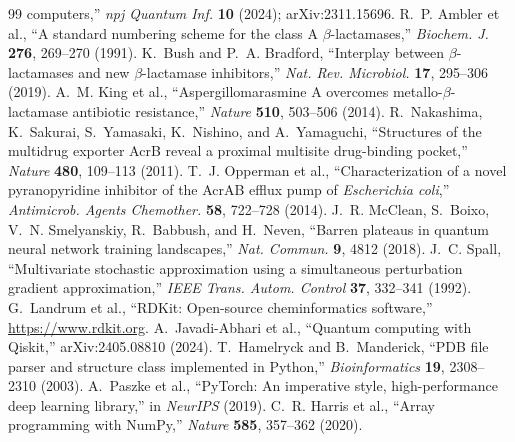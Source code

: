 \documentclass[10pt,twocolumn]{article}
\begin{document}
\begin{thebibliography}{99}
computers,'' \emph{npj Quantum Inf.} \textbf{10} (2024); arXiv:2311.15696.
 R.~P. Ambler et al., ``A standard numbering scheme for the class
A $\beta$-lactamases,'' \emph{Biochem. J.} \textbf{276}, 269--270 (1991).
 K.~Bush and P.~A. Bradford, ``Interplay between $\beta$-lactamases
and new $\beta$-lactamase inhibitors,'' \emph{Nat. Rev. Microbiol.} \textbf{17},
295--306 (2019).
 A.~M. King et al., ``Aspergillomarasmine A overcomes
metallo-$\beta$-lactamase antibiotic resistance,'' \emph{Nature} \textbf{510},
503--506 (2014).
 R.~Nakashima, K.~Sakurai, S.~Yamasaki, K.~Nishino, and
A.~Yamaguchi, ``Structures of the multidrug exporter AcrB reveal a proximal multisite
drug-binding pocket,'' \emph{Nature} \textbf{480}, 109--113 (2011).
 T.~J. Opperman et al., ``Characterization of a novel
pyranopyridine inhibitor of the AcrAB efflux pump of \emph{Escherichia coli},''
\emph{Antimicrob. Agents Chemother.} \textbf{58}, 722--728 (2014).
 J.~R. McClean, S.~Boixo, V.~N. Smelyanskiy, R.~Babbush, and
H.~Neven, ``Barren plateaus in quantum neural network training landscapes,''
\emph{Nat. Commun.} \textbf{9}, 4812 (2018).
 J.~C. Spall, ``Multivariate stochastic approximation using a
simultaneous perturbation gradient approximation,'' \emph{IEEE Trans. Autom. Control}
\textbf{37}, 332--341 (1992).
 G.~Landrum et al., ``RDKit: Open-source cheminformatics software,''
\url{https://www.rdkit.org}.
 A.~Javadi-Abhari et al., ``Quantum computing with Qiskit,''
arXiv:2405.08810 (2024).
 T.~Hamelryck and B.~Manderick, ``PDB file parser and structure
class implemented in Python,'' \emph{Bioinformatics} \textbf{19}, 2308--2310 (2003).
 A.~Paszke et al., ``PyTorch: An imperative style, high-performance
deep learning library,'' in \emph{NeurIPS} (2019).
 C.~R. Harris et al., ``Array programming with NumPy,''
\emph{Nature} \textbf{585}, 357--362 (2020).
\end{thebibliography}
\end{document}
